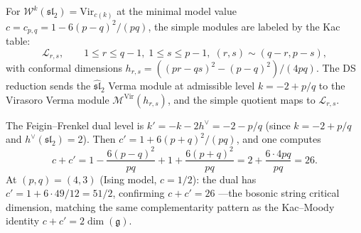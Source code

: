 \begin{example}
\label{ex:vir-minimal-modules}
For $\mathcal{W}^k(\mathfrak{sl}_2) = \mathrm{Vir}_{c(k)}$
at the minimal model value $c = c_{p,q} = 1 - 6(p-q)^2/(pq)$,
the simple modules are labeled by the Kac table:
\[
\mathcal{L}_{r,s}, \qquad
1 \leq r \leq q - 1,\; 1 \leq s \leq p - 1,\;
(r,s) \sim (q-r, p-s),
\]
with conformal dimensions $h_{r,s} = ((pr - qs)^2 - (p-q)^2)/(4pq)$.
The DS reduction sends the $\widehat{\mathfrak{sl}}_2$ Verma module
at admissible level $k = -2 + p/q$ to the Virasoro Verma module
$\mathcal{M}^{\mathrm{Vir}}(h_{r,s})$, and the simple quotient
maps to $\mathcal{L}_{r,s}$.

The Feigin--Frenkel dual level is $k' = -k - 2h^\vee = -2 - p/q$
(since $k = -2 + p/q$ and $h^\vee(\mathfrak{sl}_2) = 2$).  Then
$c' = 1 + 6(p+q)^2/(pq)$, and one computes
\[
c + c' = 1 - \frac{6(p-q)^2}{pq} + 1 + \frac{6(p+q)^2}{pq}
= 2 + \frac{6 \cdot 4pq}{pq} = 26.
\]
At $(p,q) = (4,3)$ (Ising model, $c = 1/2$): the dual has
$c' = 1 + 6 \cdot 49/12 = 51/2$, confirming $c + c' = 26$
---the bosonic string critical dimension, matching the same
complementarity pattern as the Kac--Moody identity
$c + c' = 2\dim(\mathfrak{g})$.
\end{example}

